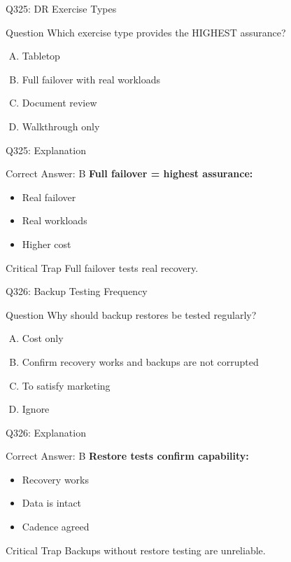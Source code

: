 \documentclass{beamer}
\begin{document}
	\begin{frame}{Q325: DR Exercise Types}
		\begin{block}{Question}
			Which exercise type provides the HIGHEST assurance?
		\end{block}
		\begin{enumerate}[(A)]
			\item Tabletop
			\item Full failover with real workloads
			\item Document review
			\item Walkthrough only
		\end{enumerate}
	\end{frame}
	
	\begin{frame}{Q325: Explanation}
		\begin{block}{Correct Answer: B}
			\textbf{Full failover = highest assurance:}
			\begin{itemize}
				\item Real failover
				\item Real workloads
				\item Higher cost
			\end{itemize}
		\end{block}
		\begin{alertblock}{Critical Trap}
			Full failover tests real recovery.
		\end{alertblock}
	\end{frame}
	
	\begin{frame}{Q326: Backup Testing Frequency}
		\begin{block}{Question}
			Why should backup restores be tested regularly?
		\end{block}
		\begin{enumerate}[(A)]
			\item Cost only
			\item Confirm recovery works and backups are not corrupted
			\item To satisfy marketing
			\item Ignore
		\end{enumerate}
	\end{frame}
	
	\begin{frame}{Q326: Explanation}
		\begin{block}{Correct Answer: B}
			\textbf{Restore tests confirm capability:}
			\begin{itemize}
				\item Recovery works
				\item Data is intact
				\item Cadence agreed
			\end{itemize}
		\end{block}
		\begin{alertblock}{Critical Trap}
			Backups without restore testing are unreliable.
		\end{alertblock}
	\end{frame}
	
\end{document}
